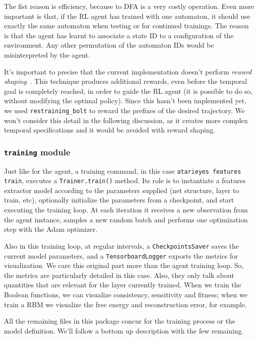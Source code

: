 The fist reason is efficiency, because \ldl{} to DFA is a very costly
operation. Even more important is that, if the RL agent has trained with one
automaton, it should use exactly the same automaton when testing or for
continued trainings. The reason is that the agent has learnt to associate a
state ID to a configuration of the environment. Any other permutation of the
automaton IDs would be misinterpreted by the agent.

It's important to precise that the current implementation doesn't perform
\emph{reward shaping}~\cite{bib:favorito-thesis}. This technique produces
additional rewards, even before the temporal goal is completely reached, in
order to guide the RL agent (it is possible to do so, without modifying the
optimal policy). Since this hasn't been implemented yet, we used
\texttt{restraining\_bolt} to reward the prefixes of the desired trajectory.
We won't consider this detail in the following discussion, as it creates more
complex temporal specifications and it would be avoided with reward shaping.


\subsubsection*{\texttt{training} module}

Just like for the agent, a training command, in this case
\verb|atarieyes features train|, executes a \verb|Trainer.train()| method.
Its role is to instantiate a features extractor model according to the
parameters supplied (net structure, layer to train, etc), optionally
initialize the parameters from a checkpoint, and start executing the training
loop.  At each iteration it receives a new observation from the agent
instance, samples a new random batch and performs one optimization step with
the Adam optimizer.

Also in this training loop, at regular intervals, a \texttt{CheckpointsSaver}
saves the current model parameters, and a \texttt{TensorboardLogger} exports
the metrics for visualization. We care this original part more than the agent
training loop. So, the metrics are particularly detailed in this case. Also,
they only talk about quantities that are relevant for the layer currently
trained. When we train the Boolean functions, we can visualize consistency,
sensitivity and fitness; when we train a RBM we visualize the free energy and
reconstruction error, for example.

All the remaining files in this package concur for the training process or the
model definition. We'll follow a bottom up description with the few remaining.


